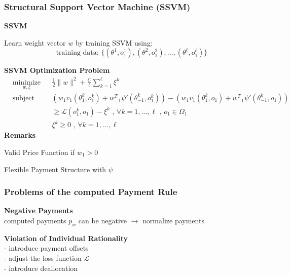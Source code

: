 \documentclass{beamer}
\begin{document}
\begin{frame}
	\frametitle{Structural Support Vector Machine (SSVM)}
	{\small
	\textbf{SSVM}
	
	\medskip
	Learn weight vector $w$ by training SSVM using:
	\vspace{-1mm}
	\begin{equation*}
	\text{training data: }\{(\theta^{1}, o_{1}^{1}),(\theta^{2}, o_{1}^{2}),...,(\theta^{\ell}, o_{1}^{\ell})\}
	\end{equation*}
	
	\pause
	\bigskip	
	\textbf{SSVM Optimization Problem}
	\vspace{-1mm}
	\begin{equation*}
	\begin{aligned}
	& \underset{w, \xi}{\text{minimize}}
	& & \frac{1}{2} \lVert w \rVert^{2} + \frac{C}{\ell} \sum_{k=1}^{\ell} \xi^{k}\\
	& \text{subject to}
	& & (w_{1}v_{1}(\theta_{1}^{k}, o_{1}^{k}) + w_{-1}^{T}\psi'(\theta_{-1}^{k},o_{1}^k)) -  (w_{1}v_{1}(\theta_{1}^{k},o_{1})+w_{-1}^{T}\psi'(\theta_{-1}^{k},o_{1})) \\ & & & 
	\geq \mathcal{L}(o_{1}^{k},o_{1}) - \xi^{k}\text{ , } 	\forall k = 1,...,\ell \text{ , } o_{1} \in \Omega_{1} \\ & & &
	\xi^{k} \geq 0 \text{ , } 	\forall k = 1,...,\ell
	\end{aligned}
	\end{equation*}
	\pause
	\textbf{Remarks}
	
	\medskip
	Valid Price Function if $w_{1}>0$
	
	\medskip
	Flexible Payment Structure with $\psi$}

\end{frame}


\begin{frame}
	\frametitle{Problems of the computed Payment Rule}	
	\textbf{Negative Payments}\\
	computed payments $p_{w}$ can be negative $\rightarrow$ normalize payments

	\bigskip\bigskip
	\textbf{Violation of Individual Rationality}\\
	 \makebox[1cm]{$\rightarrow$ \hfill} - introduce payment offsets\\
	\makebox[7.1cm]{\hfill} - adjust the loss function $\mathcal{L}$\\
	\makebox[7.1cm]{\hfill} - introduce deallocation
\end{frame}
\end{document}
